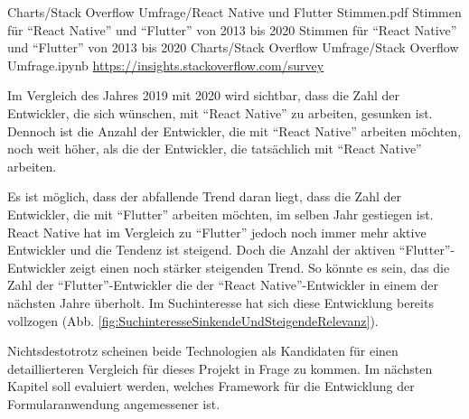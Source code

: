 \begin{alexfigurewithnotebook}{Charts/Stack Overflow Umfrage/React Native und Flutter Stimmen.pdf}
	{Stimmen für \enquote{React Native} und \enquote{Flutter} von 2013 bis 2020}
	{Stimmen für \enquote{React Native} und \enquote{Flutter} von 2013 bis 2020}
	{Charts/Stack Overflow Umfrage/Stack Overflow Umfrage.ipynb}
	{\url{https://insights.stackoverflow.com/survey}}
	\label{fig:ReactNativeUndFlutterStimmen}

\end{alexfigurewithnotebook}

Im Vergleich des Jahres 2019 mit 2020 wird sichtbar, dass die Zahl der Entwickler, die sich wünschen, mit \enquote{React Native} zu arbeiten, gesunken ist.
Dennoch ist die Anzahl der Entwickler, die mit \enquote{React Native} arbeiten möchten, noch weit höher, als die der Entwickler, die tatsächlich mit \enquote{React Native} arbeiten.

Es ist möglich, dass der abfallende Trend daran liegt, dass die Zahl der Entwickler, die mit \enquote{Flutter} arbeiten möchten, im selben Jahr gestiegen ist.
React Native hat im Vergleich zu \enquote{Flutter} jedoch noch immer mehr aktive Entwickler und die Tendenz ist steigend.
Doch die Anzahl der aktiven \enquote{Flutter}-Entwickler zeigt einen noch stärker steigenden Trend.
So könnte es sein, das die Zahl der \enquote{Flutter}-Entwickler die der \enquote{React Native}-Entwickler in einem der nächsten Jahre überholt.
Im Suchinteresse hat sich diese Entwicklung bereits vollzogen (Abb. \ref{fig:SuchinteresseSinkendeUndSteigendeRelevanz}). 

Nichtsdestotrotz scheinen beide Technologien als Kandidaten für einen detaillierteren Vergleich für dieses Projekt in Frage zu kommen.
Im nächsten Kapitel soll evaluiert werden, welches Framework für die Entwicklung der Formularanwendung angemessener ist.



